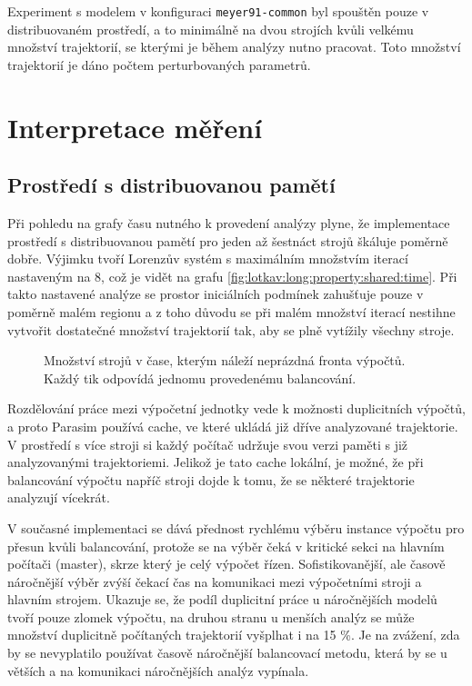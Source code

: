 Experiment s modelem v konfiguraci \texttt{meyer91-common} byl spouštěn pouze v distribuovaném prostředí,
a to minimálně na dvou strojích kvůli velkému množství trajektorií, se kterými je během analýzy nutno
pracovat. Toto množství trajektorií je dáno počtem perturbovaných parametrů.

\section{Interpretace měření}

\subsection{Prostředí s distribuovanou pamětí}

Při pohledu na grafy času nutného k provedení analýzy plyne, že implementace
prostředí s distribuovanou pamětí pro jeden až šestnáct strojů šká\-lu\-je poměrně dobře. Výjimku tvoří
Lorenzův systém s maximálním množ\-stvím iterací nastaveným na 8, což je vidět na grafu \ref{fig:lotkav:long:property:shared:time}. Při takto nastavené analýze
se prostor ini\-ci\-ál\-ních podmínek zahušťuje pouze v poměrně malém regionu a z toho důvodu se při
malém množství iterací nestihne vytvořit dostatečné množ\-ství trajektorií tak, aby se plně
vytížily všechny stroje. 

\begin{figure}[h!]
\begin{center}
\caption{Množství strojů v čase, kterým náleží neprázdná fronta výpočtů. Každý tik odpovídá jednomu provedenému balancování.}
\end{center}
\end{figure}

Rozdělování práce mezi výpočetní jednotky vede k možnosti du\-pli\-cit\-ních výpočtů,
a proto Parasim používá cache, ve které ukládá již dříve analyzované trajektorie.
V prostředí s více stroji si každý počítač udržuje svou verzi paměti s již
analyzovanými trajektoriemi. Jelikož je tato cache lokální, je možné, že při balancování
výpočtu napříč stroji dojde k tomu, že se některé trajektorie analyzují vícekrát.

V současné implementaci se dává přednost rychlému výběru instance výpočtu pro
přesun kvůli balancování, protože se na výběr čeká v kritické sekci na hlavním
počítači (master), skrze který je celý výpočet řízen. Sofistikovanější, ale časově
náročnější výběr zvýší čekací čas na komunikaci mezi výpočetními stroji a hlavním strojem.
Ukazuje se, že podíl duplicitní práce u náročnějších modelů tvoří pouze zlomek výpočtu,
na druhou stranu u menších analýz se může množství duplicitně počítaných trajektorií
vyšplhat i na 15 \%. Je na zvážení, zda by se nevyplatilo používat časově náročnější
balancovací metodu, která by se u větších a na komunikaci náročnějších analýz vypínala.

